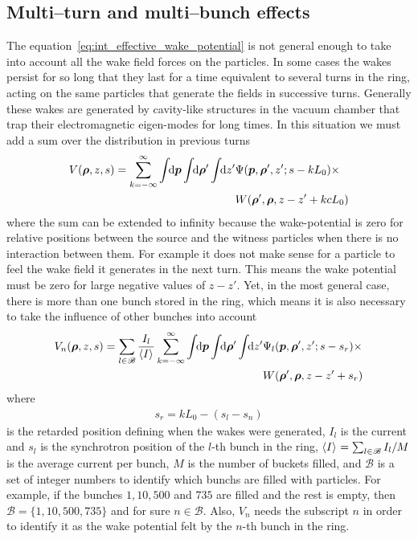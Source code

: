 \subsection{Multi--turn and multi--bunch effects}\label{ssec:multi_bunch_effects}

    The equation~\eqref{eq:int_effective_wake_potential} is not general enough to take into account all the wake field forces on the particles. In some cases the wakes persist for so long that they last for a time equivalent to several turns in the ring, acting on the same particles that generate the fields in successive turns. Generally these wakes are generated by cavity-like structures in the vacuum chamber that trap their electromagnetic eigen-modes for long times. In this situation we must add a sum over the distribution in previous turns
    \begin{align}\nonumber
  	  	V(\boldsymbol{\rho}, z, s) = \sum_{k=-\infty}^\infty\int\!\!\text{d}\boldsymbol{p} \int\!\!\text{d}\boldsymbol{\rho}' \int\!\!\text{d}z' 
	  			&\Psi(\boldsymbol{p},\boldsymbol{\rho}',z'; s-kL_0)\times\\ &W(\boldsymbol{\rho}',\boldsymbol{\rho},z-z' + kcL_0)
    \end{align}
    where the sum can be extended to infinity because the wake-potential is zero for relative positions between the source and the witness particles when there is no interaction between them. For example it does not make sense for a particle to feel the wake field it generates in the next turn. This means the wake potential must be zero for large negative values of $z-z'$. Yet, in the most general case, there is more than one bunch stored in the ring, which means it is also necessary to take the influence of other bunches into account
    \begin{align}\label{eq:general_eff_wake_pot}\nonumber
  	  	V_n(\boldsymbol{\rho}, z, s) = \sum_{l\in\mathscr{B}}\frac{I_l}{\left\langle I \right\rangle_{{}}}\sum_{k=-\infty}^\infty\int\!\!\text{d}\boldsymbol{p} \int\!\!\text{d}\boldsymbol{\rho}' \int\!\!\text{d}z' 
	  			&\Psi_l(\boldsymbol{p},\boldsymbol{\rho}',z'; s - s_r) \times\\
				&W(\boldsymbol{\rho}',\boldsymbol{\rho},z - z' + s_r)
    \end{align}
    where
    \begin{align}\label{eq:retarded_time_definition}
        s_r = kL_0-(s_l-s_n)
    \end{align}
    is the retarded position defining when the wakes were generated, $I_l$ is the current and $s_l$ is the synchrotron position of the $l$-th bunch in the ring, $\left\langle I \right\rangle_{{}}=\sum_{l\in\mathscr{B}}I_l/M$ is the average current per bunch, $M$ is the number of buckets filled, and $\mathscr{B}$ is a set of integer numbers to identify which bunchs are filled with particles. For example, if the bunches $1, 10, 500$ and $735$ are filled and the rest is empty, then $\mathscr{B} = \{ 1, 10, 500, 735 \}$ and for sure $n\in\mathscr{B}$. Also, $V_n$ needs the subscript $n$ in order to identify it as the wake potential felt by the $n$-th bunch in the ring.

